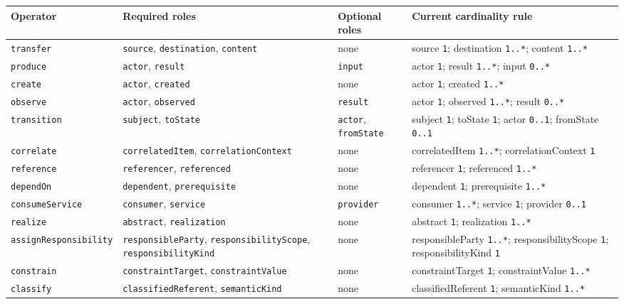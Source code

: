 \documentclass[
  10pt,
  a4paper,
]{article}
\begin{document}
\begin{longtable}[]{@{}llll@{}}
\toprule\noalign{}
Operator & Required roles & Optional roles & Current cardinality rule \\
\midrule\noalign{}
\endhead
\bottomrule\noalign{}
\endlastfoot
\texttt{transfer} & \texttt{source}, \texttt{destination},
\texttt{content} & none & source \texttt{1}; destination \texttt{1..*};
content \texttt{1..*} \\
\texttt{produce} & \texttt{actor}, \texttt{result} & \texttt{input} &
actor \texttt{1}; result \texttt{1..*}; input \texttt{0..*} \\
\texttt{create} & \texttt{actor}, \texttt{created} & none & actor
\texttt{1}; created \texttt{1..*} \\
\texttt{observe} & \texttt{actor}, \texttt{observed} & \texttt{result} &
actor \texttt{1}; observed \texttt{1..*}; result \texttt{0..*} \\
\texttt{transition} & \texttt{subject}, \texttt{toState} &
\texttt{actor}, \texttt{fromState} & subject \texttt{1}; toState
\texttt{1}; actor \texttt{0..1}; fromState \texttt{0..1} \\
\texttt{correlate} & \texttt{correlatedItem},
\texttt{correlationContext} & none & correlatedItem \texttt{1..*};
correlationContext \texttt{1} \\
\texttt{reference} & \texttt{referencer}, \texttt{referenced} & none &
referencer \texttt{1}; referenced \texttt{1..*} \\
\texttt{dependOn} & \texttt{dependent}, \texttt{prerequisite} & none &
dependent \texttt{1}; prerequisite \texttt{1..*} \\
\texttt{consumeService} & \texttt{consumer}, \texttt{service} &
\texttt{provider} & consumer \texttt{1..*}; service \texttt{1}; provider
\texttt{0..1} \\
\texttt{realize} & \texttt{abstract}, \texttt{realization} & none &
abstract \texttt{1}; realization \texttt{1..*} \\
\texttt{assignResponsibility} & \texttt{responsibleParty},
\texttt{responsibilityScope}, \texttt{responsibilityKind} & none &
responsibleParty \texttt{1..*}; responsibilityScope \texttt{1};
responsibilityKind \texttt{1} \\
\texttt{constrain} & \texttt{constraintTarget}, \texttt{constraintValue}
& none & constraintTarget \texttt{1}; constraintValue \texttt{1..*} \\
\texttt{classify} & \texttt{classifiedReferent}, \texttt{semanticKind} &
none & classifiedReferent \texttt{1}; semanticKind \texttt{1..*} \\
\end{longtable}
\end{document}
